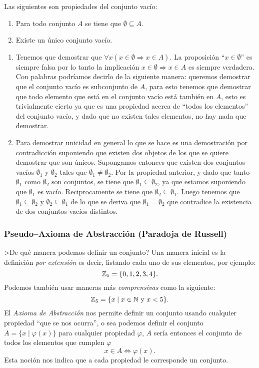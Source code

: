 \begin{teorema}
	Las siguientes son propiedades del conjunto vacío:
	\begin{enumerate}
	  \vspace*{-\topsep}
	  \itemsep 0pt
		\item Para todo conjunto $A$ se tiene que $\emptyset\subseteq A$.
		\item Existe un único conjunto vacío.		
	\end{enumerate}
	
	\begin{demostracion}
	\begin{enumerate}
	  \vspace*{-\topsep}
	  \itemsep 0pt
		\item Tenemos que demostrar que $\forall x(x\in\emptyset\Rightarrow x\in A)$.
		La proposición ``$x\in\emptyset$'' es siempre falsa por lo tanto la implicación $x\in\emptyset\Rightarrow x\in A$ es siempre verdadera.
		Con palabras podríamos decirlo de la siguiente manera: queremos demostrar que el conjunto vacío es subconjunto de $A$, para esto tenemos que demostrar que todo elemento que está en el conjunto vacío está también en $A$, esto es trivialmente cierto ya que es una propiedad acerca de ``todos los elementos'' del conjunto vacío, y dado que no existen tales elementos, no hay nada que demostrar.
		\item Para demostrar unicidad en general lo que se hace es una demostración por contradicción suponiendo que existen dos objetos de los que se quiere demostrar que son únicos.
		Supongamos entonces que existen dos conjuntos vacíos $\emptyset_1$ y $\emptyset_2$ tales que $\emptyset_1\not=\emptyset_2$.
		Por la propiedad anterior, y dado que tanto $\emptyset_1$ como $\emptyset_2$ son conjuntos, se tiene que $\emptyset_1\subseteq\emptyset_2$, ya que estamos suponiendo que $\emptyset_1$ es vacío.
		Reciprocamente se tiene que $\emptyset_2\subseteq\emptyset_1$.
		Luego tenemos que $\emptyset_1\subseteq\emptyset_2$ y $\emptyset_2\subseteq\emptyset_1$ de lo que se deriva que $\emptyset_1=\emptyset_2$ que contradice la existencia de dos conjuntos vacíos distintos.
	\end{enumerate}
	\end{demostracion}
\end{teorema}

\subsubsection*{Pseudo--Axioma de Abstracción (Paradoja de Russell)}
>De qué manera podemos definir un conjunto?
Una manera inicial es la definición \emph{por extensión} es decir, listando cada uno de sus elementos, por ejemplo:
\[
\mathbb{Z}_5=\{0,1,2,3,4\}.
\]
Podemos también usar maneras más \emph{comprensivas} como la siguiente:
\[
\mathbb{Z}_5=\{x\;|\;x\in\mathbb{N}\text{ y } x<5\}.
\]
El \emph{Axioma de Abstracción} nos permite definir un conjunto usando cualquier propiedad ``que se nos ocurra'', o sea podemos definir el conjunto $A=\{x\;|\;\varphi(x)\}$ para cualquier propiedad $\varphi$, $A$ sería entonces el conjunto de todos los elementos que cumplen $\varphi$
\[
x\in A\Leftrightarrow\varphi(x).
\]
Esta noción nos indica que a cada propiedad le corresponde un conjunto.

